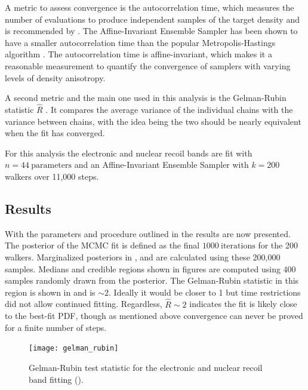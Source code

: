 A metric to assess convergence is the autocorrelation time, which measures the number
of evaluations to produce independent samples of the target density and is recommended by .  The Affine-Invariant
Ensemble Sampler has been shown to have a smaller autocorrelation time than the popular Metropolis-Hastings algorithm
.  The autocorrelation time is affine-invariant, which makes it a reasonable measurement to quantify
the convergence of samplers with varying levels of density anisotropy.

A second metric and the main one used in
this analysis is the Gelman-Rubin statistic $\hat{R}$ .  It compares the average variance of the individual chains
with the variance between chains, with the idea being the two should be nearly equivalent when the fit has converged.

For this analysis the electronic and nuclear recoil bands are fit with  $n = 44\ \mathrm{parameters}$ and an Affine-Invariant Ensemble
Sampler with $k = 200$ walkers over 11,000 steps.



\subsection{Results}
\label{subsec:er_nr_calibrations_results}
With the parameters and procedure outlined in  the results are now
presented.  The posterior of the MCMC fit is defined as the final $1000\ \mathrm{iterations}$ for the 200 walkers.  Marginalized
posteriors in ,  and
 are calculated using these 200,000 samples.  Medians and credible regions shown in
figures are computed using 400 samples randomly drawn from the posterior.  The Gelman-Rubin statistic in this region is
shown in  and is ${\sim}2$.  Ideally it would be closer to 1 but time restrictions did not allow
continued fitting.  Regardless, $\hat{R} \sim 2$ indicates the fit is likely close to the best-fit PDF, though as mentioned above
convergence can never be proved for a finite number of steps.

\begin{figure}
\centering
\texttt{[image: gelman\_rubin]}
\caption{Gelman-Rubin test statistic for the electronic and nuclear recoil band fitting
().}
\label{fig:er_nr_calibrations_results_gr}
\end{figure}


